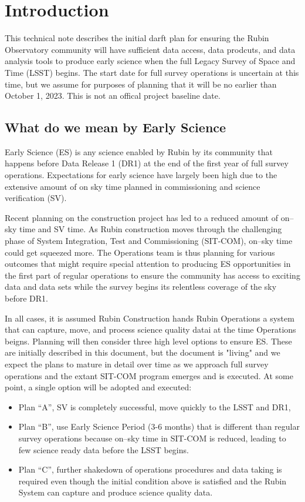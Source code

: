 \section{Introduction}
This technical note describes the initial darft plan for ensuring the Rubin Observatory community will have sufficient data access, data prodcuts, and data analysis tools to produce early science when the full Legacy Survey of Space and Time (LSST)  begins. The start date for full survey operations is uncertain at this time, but we assume for purposes of planning that it will be no earlier than October 1, 2023. This is not an offical project baseline date.

\subsection{What do we mean by Early Science}

Early Science (ES) is any science enabled by Rubin by its community that happens before Data Release 1 (DR1) at the end of the first year of full survey operations. Expectations for early science have largely been high due to the extensive amount of on sky time planned in commissioning and science verification (SV).  

Recent planning on the construction project has led to a reduced amount of on--sky time and SV time.
As Rubin construction moves through the challenging phase of System Integration, Test and Commissioning (SIT-COM), on--sky time could get squeezed more. The Operations team is thus planning for various outcomes that might require special attention to producing ES opportunities in the first part of regular operations to ensure the community has access to exciting data and data sets while the survey begins its relentless coverage of the sky before DR1.

In all cases, it is assumed Rubin Construction hands Rubin Operations a system that can capture, move, and process science quality datai at the time Operations beigns. Planning will then consider three high level options to ensure ES. These are initially described in this document, but the document is "living" and we expect the plans to mature in detail over time as we approach full survey operations and the extant SIT-COM program emerges and is executed. At some point, a single option will be adopted and executed:

\begin{itemize}

\item Plan “A”, SV is completely successful, move quickly to the LSST and DR1,

\item Plan “B”, use Early Science Period (3-6 months) that is different than regular survey operations because on--sky time in SIT-COM is reduced, leading to few science ready data before the LSST begins.

\item Plan “C”, further shakedown of operations procedures and data taking is required even though the initial condition above is satisfied and the Rubin System can capture and produce science quality data.

\end{itemize}

